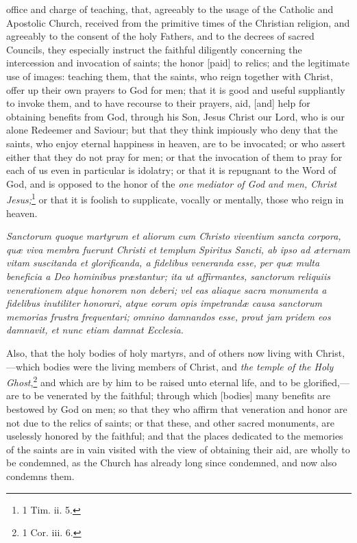 office and charge of teaching, that, agreeably to the usage of the Catholic and Apostolic Church, received from the primitive times of the Christian religion, and agreeably to the consent of the holy Fathers, and to the decrees of sacred Councils, they especially instruct the faithful diligently concerning the intercession and invocation of saints; the honor [paid] to relics; and the legitimate use of images: teaching them, that the saints, who reign together with Christ, offer up their own prayers to God for men; that it is good and useful suppliantly to invoke them, and to have recourse to their prayers, aid, [and] help for obtaining benefits from God, through his Son, Jesus Christ our Lord, who is our alone Redeemer and Saviour; but that they think impiously who deny that the saints, who enjoy eternal happiness in heaven, are to be invocated; or who assert either that they do not pray for men; or that the invocation of them to pray for each of us even in particular is idolatry; or that it is repugnant to the Word of God, and is opposed to the honor of the \emph{one mediator of God and men, Christ Jesus;}\footnote{\par   1 Tim. ii. 5.} or that it is foolish to supplicate, vocally or mentally, those who reign in heaven.

\emph{Sanctorum quoque martyrum et aliorum cum Christo viventium sancta corpora, quæ viva membra fuerunt Christi et templum Spiritus Sancti, ab ipso ad æternam vitam suscitanda et glorificanda, a fidelibus veneranda esse, per quæ multa beneficia a Deo hominibus præstantur; ita ut affirmantes, sanctorum reliquiis venerationem atque honorem non deberi; vel eas aliaque sacra monumenta a fidelibus inutiliter honorari, atque eorum opis impetrandæ causa sanctorum memorias frustra frequentari; omnino damnandos esse, prout jam pridem eos damnavit, et nunc etiam damnat Ecclesia.}

Also, that the holy bodies of holy martyrs, and of others now living with Christ,—which bodies were the living members of Christ, and \emph{the temple of the Holy Ghost},\footnote{\par   1 Cor. iii. 6.} and which are by him to be raised unto eternal life, and to be glorified,—are to be venerated by the faithful; through which [bodies] many benefits are bestowed by God on men; so that they who affirm that veneration and honor are not due to the relics of saints; or that these, and other sacred monuments, are uselessly honored by the faithful; and that the places dedicated to the memories of the saints are in vain visited with the view of obtaining their aid, are wholly to be condemned, as the Church has already long since condemned, and now also condemns them.

